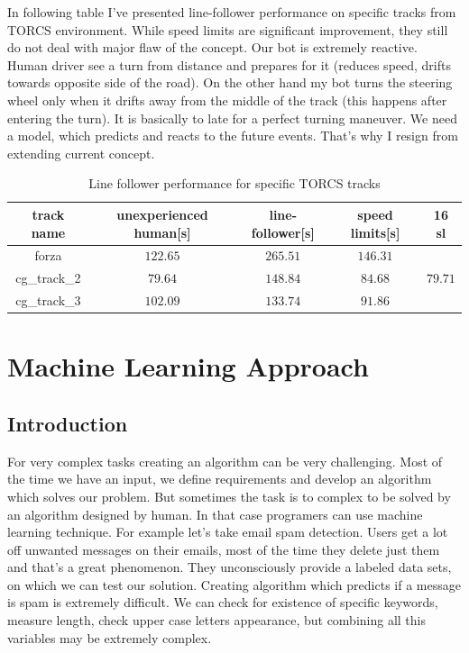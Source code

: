 \documentclass[declaration,shortabstract,english,inz]{iithesis}
\begin{document}
In following table I've presented line-follower performance on specific tracks from TORCS environment.
While speed limits are significant improvement, they still do not deal with major flaw of the concept.
Our bot is extremely reactive.
Human driver see a turn from distance and prepares for it (reduces speed, drifts towards opposite side of the road).
On the other hand my bot turns the steering wheel only when it drifts away from the middle of the track (this happens after entering the turn).
It is basically to late for a perfect turning maneuver.
We need a model, which predicts and reacts to the  future events.
That's why I resign from extending current concept.


\begin{table}[h]
    \centering
    \begin{tabular}{ |c|c|c|c|c|}
          \hline
          track name & unexperienced human[s] & line-follower[s] & speed limits[s] & 16 sl  \\
          \hline
          forza &  $122.65$ & $265.51$ & $146.31$   \\
          \hline
          cg\_track\_2 & $79.64$ & $148.84$ &  $84.68$ & $79.71$ \\ 
          \hline
          cg\_track\_3 & $102.09$ & $133.74$ & $91.86$   \\
          \hline
    \end{tabular}
        \caption{Line follower performance for specific TORCS tracks}
        \label{tab:line_follower}

\end{table}

\chapter{Machine Learning Approach}

\section{Introduction}


For very complex tasks creating an algorithm can be very challenging.
 Most of the time we have an input, we define requirements and develop an algorithm which solves our problem.
But sometimes the task is to complex to be solved by an algorithm designed by human.
In that case programers can use machine learning technique.
For example let's take email spam detection.
Users get a lot off unwanted messages on their emails, most of the time they delete just them and that's a great phenomenon.
They unconsciously provide a labeled data sets, on which we can test our solution.
Creating algorithm which predicts if a message is spam is extremely difficult.
We can check for existence of specific keywords, measure length, check upper case letters appearance, but combining all this variables may be extremely complex.
\end{document}

